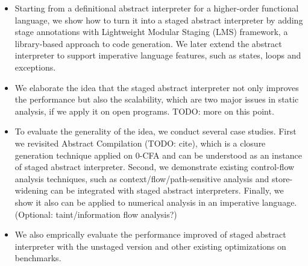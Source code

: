 \begin{itemize}
\item Starting from a definitional abstract interpreter for a higher-order functional language,
  we show how to turn it into a staged abstract interpreter by adding stage annotations with 
  Lightweight Modular Staging (LMS) framework, a library-based approach to code generation. 
  We later extend the abstract interpreter to support
  imperative language features, such as states, loops and exceptions.
\item We elaborate the idea that the staged abstract interpreter not only improves the performance 
  but also the scalability, which are two major issues in static analysis, if we apply it on open
  programs. TODO: more on this point.
\item To evaluate the generality of the idea, we conduct several case studies. 
  First we revisited Abstract Compilation (TODO: cite), which is a closure generation technique applied 
  on 0-CFA and can be understood as an instance of staged abstract interpreter. 
  Second, we demonstrate existing control-flow analysis techniques, such as context/flow/path-sensitive 
  analysis and store-widening can be integrated with staged abstract interpreters.
  Finally, we show it also can be applied to numerical analysis in an imperative language.
  (Optional: taint/information flow analysis?)
\item We also emprically evaluate the performance improved of staged abstract interpreter with the
  unstaged version and other existing optimizations on benchmarks.
\end{itemize}
